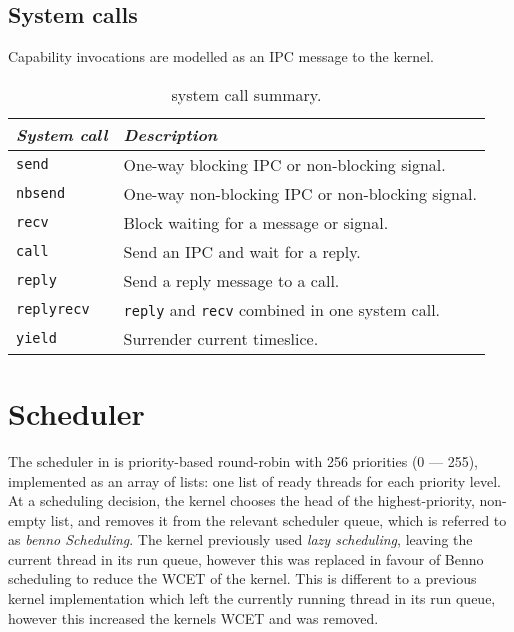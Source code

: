 
\subsection{System calls}


Capability invocations are modelled as an IPC message to the kernel. 

\begin{table} 
    \centering
    \begin{tabular}{lp{}}\toprule
        \emph{System call} & \emph{Description} \\\midrule
        \texttt{send}      & One-way blocking \gls{IPC} or non-blocking signal.\\
        \texttt{nbsend}    & One-way non-blocking \gls{IPC} or non-blocking signal.\\
        \texttt{recv}      & Block waiting for a message or signal. \\
        \texttt{call}      & Send an IPC and wait for a reply. \\
        \texttt{reply}     & Send a reply message to a call.\\
        \texttt{replyrecv} & \texttt{reply} and \texttt{recv} combined in one system call.\\
        \texttt{yield}     & Surrender current timeslice. \\
        \bottomrule
    \end{tabular}
    \caption{\selfour system call summary.}
    \label{t:system-calls}
\end{table}



\section{Scheduler}

The scheduler in \selfour is priority-based round-robin with 256 priorities (0 --- 255), implemented as an array of lists: one list of ready threads for each priority level. 
At a scheduling decision, the kernel chooses the head of the highest-priority, non-empty list, and removes it from the relevant scheduler queue, which is referred to as \emph{benno Scheduling}.
The kernel previously used \emph{lazy scheduling}, leaving the current thread in its run queue, however this was replaced in favour of Benno scheduling to reduce the WCET of the kernel. 
This is different to a previous kernel implementation which left the currently running thread in its run queue, however this increased the kernels \gls{WCET} and was removed.

